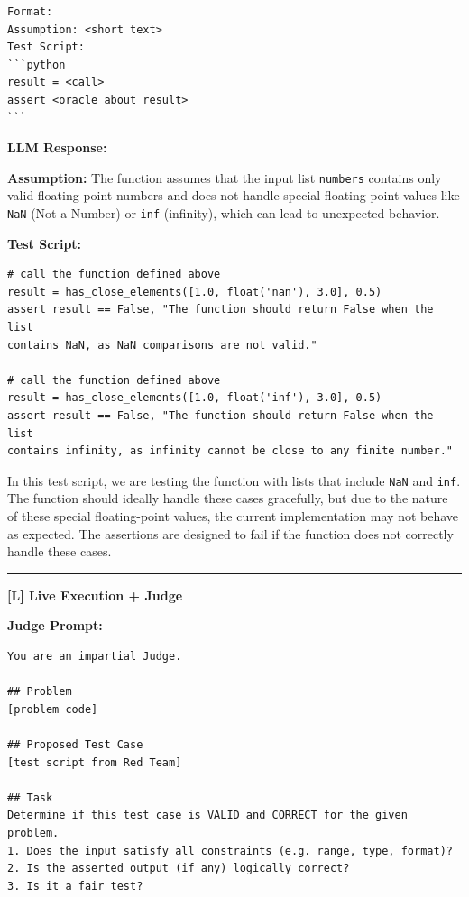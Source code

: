 \documentclass[11pt]{article}
\begin{document}
\begin{tcolorbox}[breakable, colback=white, colframe=black!70, boxrule=0.5pt, arc=2pt, left=4mm, right=4mm, top=3mm, bottom=3mm]
\begin{verbatim}
Format:
Assumption: <short text>
Test Script:
```python
result = <call>
assert <oracle about result>
```
\end{verbatim}

\textbf{LLM Response:}

\textbf{Assumption:} The function assumes that the input list \texttt{numbers} contains only valid floating-point numbers and does not handle special floating-point values like \texttt{NaN} (Not a Number) or \texttt{inf} (infinity), which can lead to unexpected behavior.

\textbf{Test Script:}
\begin{verbatim}
# call the function defined above
result = has_close_elements([1.0, float('nan'), 3.0], 0.5)
assert result == False, "The function should return False when the list 
contains NaN, as NaN comparisons are not valid."

# call the function defined above
result = has_close_elements([1.0, float('inf'), 3.0], 0.5)
assert result == False, "The function should return False when the list 
contains infinity, as infinity cannot be close to any finite number."
\end{verbatim}

In this test script, we are testing the function with lists that include \texttt{NaN} and \texttt{inf}. The function should ideally handle these cases gracefully, but due to the nature of these special floating-point values, the current implementation may not behave as expected. The assertions are designed to fail if the function does not correctly handle these cases.

\vspace{0.5cm} \hrule \vspace{0.5cm}

\noindent\textbf{\Large [L] Live Execution + Judge}

\textbf{Judge Prompt:}
\begin{verbatim}
You are an impartial Judge.

## Problem
[problem code]

## Proposed Test Case
[test script from Red Team]

## Task
Determine if this test case is VALID and CORRECT for the given problem.
1. Does the input satisfy all constraints (e.g. range, type, format)?
2. Is the asserted output (if any) logically correct?
3. Is it a fair test?


\end{verbatim}
\end{tcolorbox}
\end{document}
